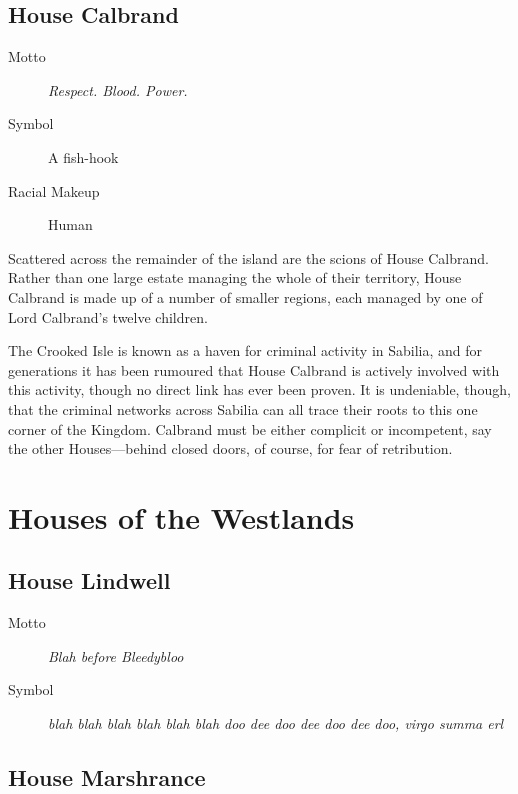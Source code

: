 \documentclass[10pt,twoside,openright,a4paper,twocolumn]{book}
\begin{document}
\subsection*{House Calbrand}

\begin{description}
\item[Motto] \textit{Respect. Blood. Power.}

\item[Symbol] A fish-hook

\item[Racial Makeup] Human
\end{description}

\noindent
Scattered across the remainder of the island are the scions of House Calbrand.
Rather than one large estate managing the whole of their territory, House
Calbrand is made up of a number of smaller regions, each managed by one of
Lord Calbrand's twelve children.

The Crooked Isle is known as a haven for criminal activity in Sabilia, and for
generations it has been rumoured that House Calbrand is actively involved with
this activity, though no direct link has ever been proven.  It is undeniable,
though, that the criminal networks across Sabilia can all trace their roots to
this one corner of the Kingdom.  Calbrand must be either complicit or
incompetent, say the other Houses---behind closed doors, of course, for fear of
retribution.

\section{Houses of the Westlands}

\lipsum[1]

\subsection*{House Lindwell}

\begin{description}
\item[Motto] \textit{Blah before Bleedybloo}

\item[Symbol] \textit{blah blah blah blah blah blah
doo dee doo dee doo dee doo, virgo summa erl}
\end{description}

\lipsum[1]

\subsection*{House Marshrance}
\end{document}
